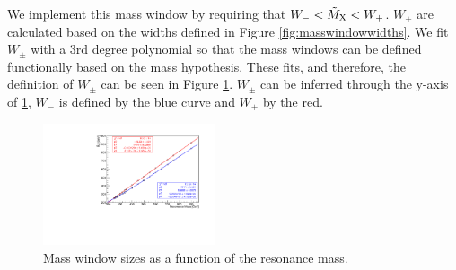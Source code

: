 We implement this mass window by requiring that $W_{-} < \tilde{M}_{\mathrm{X}} < W_{+}$. 
$W_{\pm}$ are calculated based on the widths defined in Figure \ref{fig:masswindowwidths}. 
We fit $W_{\pm}$ with a 3rd degree polynomial so that the mass windows can be defined functionally based on the mass hypothesis. 
These fits, and therefore, the definition of $W_{\pm}$ can be seen in Figure \ref{fig:masswindowfit}. 
$W_{\pm}$ can be inferred through the y-axis of \ref{fig:masswindowfit}, $W_{-}$ is defined by the blue curve and $W_{+}$ by the red. 

\begin{figure}[h]
  \centering
  \includegraphics[width=0.45\textwidth]{figures/sec-window/fit_60_prime.pdf}\hfil

  \caption{Mass window sizes as a function of the resonance mass. }
  \label{fig:masswindowfit}
\end{figure}

